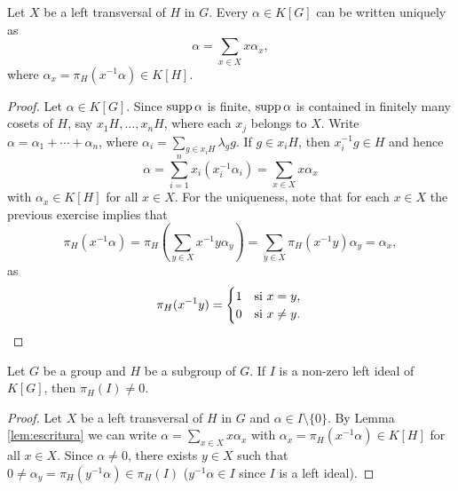 
\begin{lemma}
	\label{lem:escritura}
	Let $X$ be a left transversal of $H$ in $G$. Every $\alpha\in K[G]$ can be written
	uniquely as 
	\[
	\alpha=\sum_{x\in X}x\alpha_x,
	\]
	where $\alpha_x=\pi_H(x^{-1}\alpha)\in K[H]$.
\end{lemma}

\begin{proof}
	Let $\alpha\in K[G]$. Since $\operatorname{supp}\alpha$ is finite, $\operatorname{supp}\alpha$ is contained 
    in finitely many cosets of $H$, say $x_1H,\dots,x_nH$, where each 
	$x_j$ belongs to $X$. Write $\alpha=\alpha_1+\cdots+\alpha_n$,
	where $\alpha_i=\sum_{g\in x_iH}\lambda_gg$. If $g\in x_iH$, then 
	$x_i^{-1}g\in H$ and hence 
	\[
		\alpha=\sum_{i=1}^n x_i(x_i^{-1}\alpha_i)=\sum_{x\in X}x\alpha_x
	\]
	with $\alpha_x\in K[H]$ for all $x\in X$. For the uniqueness, note that 
	for each  $x\in X$ the previous exercise implies that  
	\[
		\pi_H(x^{-1}\alpha)
		=\pi_H\left(\sum_{y\in X}x^{-1}y\alpha_y\right)
		=\sum_{y\in X}\pi_H(x^{-1}y)\alpha_y=\alpha_x, 
	\]
	as  
	\[
		\pi_H(x^{-1}y)=\begin{cases}
		1 & \text{si $x=y$},\\
		0 & \text{si $x\ne y$}.
	\end{cases}\qedhere 
	\]
\end{proof}


\begin{lemma}
	\label{lem:ideal_pi}
	Let $G$ be a group and $H$ be a subgroup of $G$. If $I$ is a non-zero 
	left ideal
	of $K[G]$, then  $\pi_H(I)\ne 0$.
\end{lemma}

\begin{proof}
	Let $X$ be a left transversal of $H$ in $G$ and $\alpha\in I\setminus\{0\}$. By Lemma
	\ref{lem:escritura} we can write $\alpha=\sum_{x\in
	X}x\alpha_x$ with $\alpha_x=\pi_H(x^{-1}\alpha)\in K[H]$ for all $x\in X$.
	Since $\alpha\ne0$, there exists $y\in X$ such that $0\ne
	\alpha_y=\pi_H(y^{-1}\alpha)\in\pi_H(I)$ ($y^{-1}\alpha\in I$ since $I$ is 
    a left ideal).
\end{proof}

